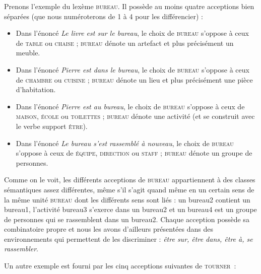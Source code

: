 Prenons l’exemple du lexème \textsc{bureau}. Il possède au moins quatre acceptions bien séparées (que nous numéroterons de 1 à 4 pour les différencier) :

\begin{itemize}
\item Dans l’énoncé \textit{Le livre est sur le bureau}, le choix de \textsc{bureau} s’oppose à ceux de \textsc{table} ou \textsc{chaise} ; \textsc{bureau} dénote un artefact et plus précisément un meuble.
\item Dans l’énoncé \textit{Pierre est dans le bureau}, le choix de \textsc{bureau} s’oppose à ceux de \textsc{chambre} ou \textsc{cuisine} ; \textsc{bureau} dénote un lieu et plus précisément une pièce d’habitation.
\item Dans l’énoncé \textit{Pierre est au bureau}, le choix de \textsc{bureau} s’oppose à ceux de \textsc{maison,} \textsc{école} ou \textsc{toilettes} ; \textsc{bureau} dénote une activité (et se construit avec le verbe support \textsc{être}).
\item\sloppy Dans l’énoncé \textit{Le bureau s’est rassemblé à nouveau}, le choix de \textsc{bureau} s’oppose à ceux de \textsc{équipe,} \textsc{direction} ou \textsc{staff} ; \textsc{bureau} dénote un groupe de personnes.
\end{itemize}%

Comme on le voit, les différents acceptions de \textsc{bureau} appartiennent à des classes sémantiques assez différentes, même s’il s’agit quand même en un certain sens de la même unité \textsc{bureau} dont les différents sens sont liés : un bureau2 contient un bureau1, l’activité bureau3 s’exerce dans un bureau2 et un bureau4 est un groupe de personnes qui se rassemblent dans un bureau2. Chaque acception possède sa combinatoire propre et nous les avons d’ailleurs présentées dans des environnements qui permettent de les discriminer : \textit{être sur, être dans, être à, se rassembler}.

Un autre exemple est fourni par les cinq acceptions suivantes de \textsc{tourner~}:


